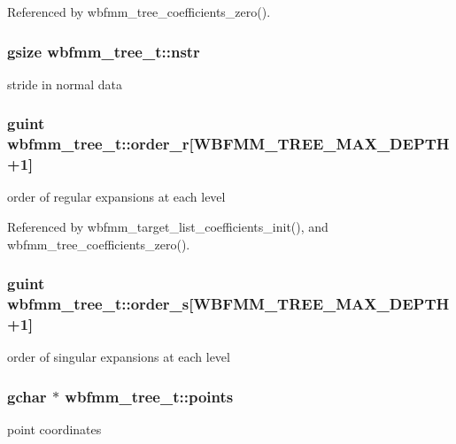 Referenced by wbfmm\+\_\+tree\+\_\+coefficients\+\_\+zero().

\subsubsection[{nstr}]{\setlength{\rightskip}{0pt plus 5cm}gsize wbfmm\+\_\+tree\+\_\+t\+::nstr}\label{structwbfmm__tree__t_a08a9529a7fa528397018d63951c647a4}
stride in normal data 
\subsubsection[{order\+\_\+r}]{\setlength{\rightskip}{0pt plus 5cm}guint wbfmm\+\_\+tree\+\_\+t\+::order\+\_\+r[W\+B\+F\+M\+M\+\_\+\+T\+R\+E\+E\+\_\+\+M\+A\+X\+\_\+\+D\+E\+P\+T\+H+1]}\label{structwbfmm__tree__t_a3977c9974da5fbeaa66a9b1eea6fd235}
order of regular expansions at each level 

Referenced by wbfmm\+\_\+target\+\_\+list\+\_\+coefficients\+\_\+init(), and wbfmm\+\_\+tree\+\_\+coefficients\+\_\+zero().

\subsubsection[{order\+\_\+s}]{\setlength{\rightskip}{0pt plus 5cm}guint wbfmm\+\_\+tree\+\_\+t\+::order\+\_\+s[W\+B\+F\+M\+M\+\_\+\+T\+R\+E\+E\+\_\+\+M\+A\+X\+\_\+\+D\+E\+P\+T\+H+1]}\label{structwbfmm__tree__t_a4dcb4eecb4b78afa20215a391db8ab0e}
order of singular expansions at each level 
\subsubsection[{points}]{\setlength{\rightskip}{0pt plus 5cm}gchar $\ast$ wbfmm\+\_\+tree\+\_\+t\+::points}\label{structwbfmm__tree__t_a82a6af6a6d054522a860e1a536f6a105}
point coordinates 
